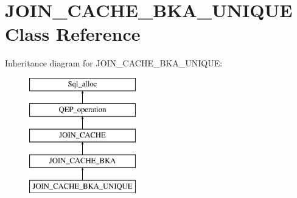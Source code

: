 \hypertarget{classJOIN__CACHE__BKA__UNIQUE}{}\section{J\+O\+I\+N\+\_\+\+C\+A\+C\+H\+E\+\_\+\+B\+K\+A\+\_\+\+U\+N\+I\+Q\+UE Class Reference}
\label{classJOIN__CACHE__BKA__UNIQUE}
Inheritance diagram for J\+O\+I\+N\+\_\+\+C\+A\+C\+H\+E\+\_\+\+B\+K\+A\+\_\+\+U\+N\+I\+Q\+UE\+:\begin{figure}[H]
\begin{center}
\leavevmode
\includegraphics[height=5.000000cm]{classJOIN__CACHE__BKA__UNIQUE}
\end{center}
\end{figure}
